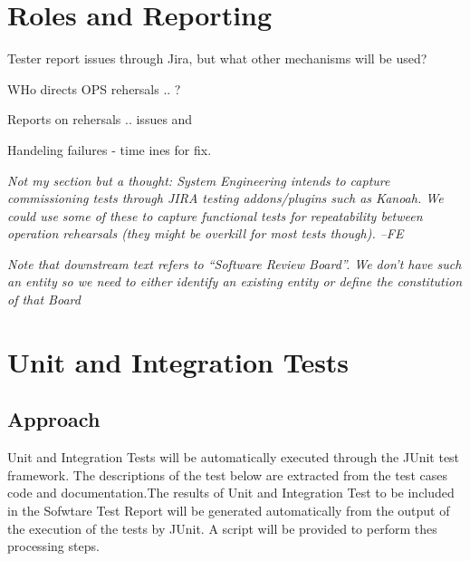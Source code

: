 




\section{Roles and Reporting}

Tester report issues through Jira, but what other mechanisms will be used?

WHo directs OPS rehersals .. ?

Reports on rehersals .. issues and 

Handeling failures - time ines for fix. 


\textit{Not my section but a thought: System Engineering intends to capture commissioning tests through JIRA testing addons/plugins such as Kanoah. We could use some of these to capture functional tests for repeatability between operation rehearsals (they might be overkill for most tests though). --FE}

\textit{Note that downstream text refers to ``Software Review Board''. We don't have such an entity so we need to either identify an existing entity or define the constitution of that Board}






 








\section{Unit and Integration Tests}

\subsection{Approach}

Unit and Integration Tests will be automatically executed through the JUnit test framework. The descriptions of the test below are extracted from the test cases code and documentation.The results of Unit and Integration Test to be included in the Sofwtare Test Report will be generated automatically from the output of the execution of the tests by JUnit. A script will be provided to perform thes processing steps.

